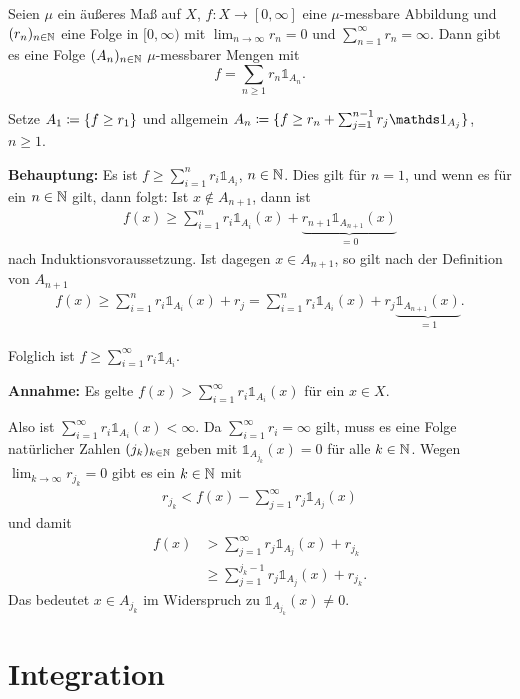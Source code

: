 \documentclass[a4paper,twoside,DIV15,BCOR12mm]{scrbook}
\newcommand{\ind}{\mathds 1}
\begin{document}
\begin{satz}
Seien $\mu$ ein äußeres Maß auf $X$, $f: X \to [0,\infty]$ eine $\mu$-messbare Abbildung und $(r_n)_{n\in\mathbb{N}}$ eine Folge in $[0,\infty)$ mit $\lim_{n\to\infty} r_n = 0$ und $\sum_{n=1}^\infty r_n = \infty$. Dann gibt es eine Folge $(A_n)_{n\in\mathbb{N}}$ $\mu$-messbarer Mengen mit
\[
f = \sum_{n\ge1} r_n \ind_{A_n}.
\]
\end{satz}

\begin{beweis}
Setze $A_1 \da \{ f \ge r_1 \}$ und allgemein $A_n \da \{f \ge r_n + \sum_{j=1}^{n-1} r_j \ind_{A_j}\}$, $n\ge 1$.

\textbf{Behauptung:} Es ist $f \ge \sum_{i=1}^n r_i \ind_{A_i}$, $n\in\mathbb{N}$. Dies gilt für $n=1$, und wenn es für ein $n\in\mathbb{N}$ gilt, dann folgt: Ist $x\notin A_{n+1}$, dann ist
\begin{align*}
f(x) \ge \sum_{i=1}^n r_i \ind_{A_i}(x) + \underbrace{r_{n+1}\ind_{A_{n+1}}(x)}_{=0}
\end{align*}
nach Induktionsvoraussetzung. Ist dagegen $x\in A_{n+1}$, so gilt nach der Definition von $A_{n+1}$
\begin{align*}
f(x) \ge \sum_{i=1}^n r_i \ind_{A_i}(x) + r_j = \sum_{i=1}^n r_i \ind_{A_i}(x) + r_j \underbrace{\ind_{A_{n+1}}(x)}_{=1}.
\end{align*}

Folglich ist $f\ge \sum_{i=1}^\infty r_i \ind_{A_i}$.

\textbf{Annahme:} Es gelte $f(x) > \sum_{i=1}^\infty r_i \ind_{A_i}(x)$ für ein $x\in X$.

Also ist $\sum_{i=1}^\infty r_i \ind_{A_i}(x)<\infty$. Da $\sum_{i=1}^\infty r_i = \infty$ gilt, muss es eine Folge natürlicher Zahlen $(j_k)_{k\in\mathbb{N}}$ geben mit $\ind_{A_{j_k}}(x)=0$ für alle $k\in\mathbb{N}$.
Wegen $\lim_{k\to\infty} r_{j_k} = 0$ gibt es ein $k\in\mathbb{N}$ mit
\begin{align*}
r_{j_k} < f(x) - \sum_{j=1}^\infty r_j \ind_{A_j}(x)
\end{align*}
und damit 
\begin{align*}
f(x) &> \sum_{j=1}^\infty r_j \ind_{A_j}(x) + r_{j_k} \\
&\ge \sum_{j=1}^{j_k-1} r_j \ind_{A_j}(x) + r_{j_k}.
\end{align*}
Das bedeutet $x\in A_{j_k}$ im Widerspruch zu $\ind_{A_{j_k}}(x) \ne 0$.
\end{beweis}

\section{Integration}
\end{document}
